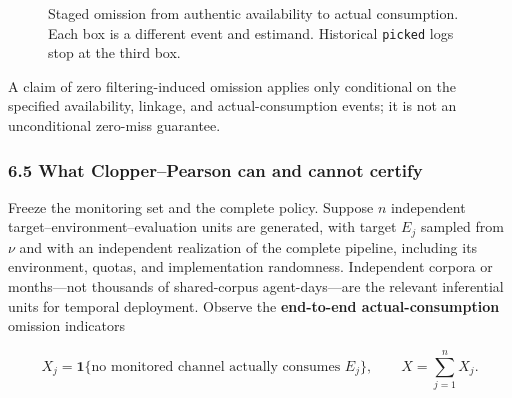 \documentclass[
  11pt]{article}
\begin{document}
\begin{figure}[htbp]
\centering
{}
\caption{Staged omission from authentic availability to actual consumption. Each box is a different event and estimand. Historical \texttt{picked} logs stop at the third box.}
\label{fig:omission-stages}
\end{figure}

A claim of zero filtering-induced omission applies only conditional on
the specified availability, linkage, and actual-consumption events; it
is not an unconditional zero-miss guarantee.

\subsubsection{6.5 What Clopper--Pearson can and cannot
certify}\label{what-clopperpearson-can-and-cannot-certify}

Freeze the monitoring set and the complete policy. Suppose \(n\)
independent target--environment--evaluation units are generated, with
target \(E_j\) sampled from \(\nu\) and with an independent realization
of the complete pipeline, including its environment, quotas, and
implementation randomness. Independent corpora or months---not thousands
of shared-corpus agent-days---are the relevant inferential units for
temporal deployment. Observe the \textbf{end-to-end actual-consumption}
omission indicators

\[X_j=\mathbf 1\{\text{no monitored channel actually consumes }E_j\},\qquad X=\sum_{j=1}^nX_j.\]
\end{document}
